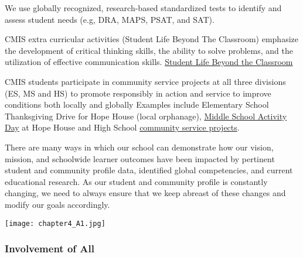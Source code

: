 \begin{findings}
We use globally recognized, research-based standardized tests to identify and assess student needs (e.g, DRA, MAPS, PSAT, and SAT). 

CMIS extra curricular activities (Student Life Beyond The Classroom) emphasize the development of critical thinking skills, the ability to solve problems, and the utilization of effective communication skills. \href{http://blogs.cmis.ac.th/eagles/}{Student Life Beyond the Classroom}

CMIS students participate in community service projects at all three divisions (ES, MS and HS) to promote responsibly in action and service to improve conditions both locally and globally Examples include Elementary School Thanksgiving Drive for Hope House (local orphanage), \href{https://drive.google.com/a/cmis.ac.th/file/d/0B7jcj1TRcFEGNEtqR3hUSW5QVHM/view?usp=sharing}{Middle School Activity Day} at Hope House and High School \href{http://blogs.cmis.ac.th/community-service/}{community service projects}.


There are many ways in which our school can demonstrate how our vision, mission, and schoolwide learner outcomes have been impacted by pertinent student and community profile data, identified global competencies, and current educational research. 
As our student and community profile is constantly changing, we need to always ensure that we keep abreast of these changes and modify our goals accordingly.
\end{findings}

{\centering\texttt{[image: chapter4\_A1.jpg]}}

\subsubsection{Involvement of All}



